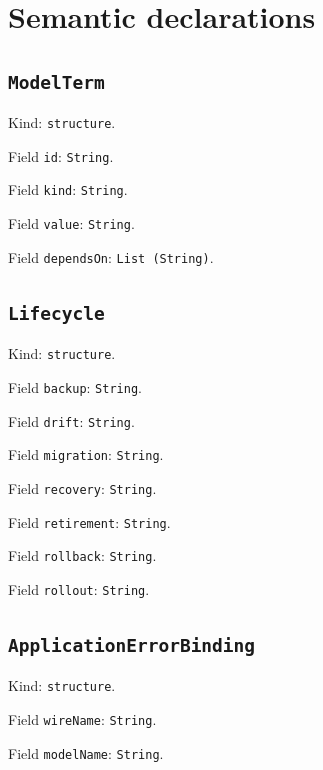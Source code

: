 \documentclass[11pt]{article}
\begin{document}
\section*{Semantic declarations}
\subsection*{\texttt{ModelTerm}}
\noindent Kind: \texttt{structure}.\par
\noindent Field \texttt{id}: \texttt{String}.\par
\noindent Field \texttt{kind}: \texttt{String}.\par
\noindent Field \texttt{value}: \texttt{String}.\par
\noindent Field \texttt{dependsOn}: \texttt{List (String)}.\par
\subsection*{\texttt{Lifecycle}}
\noindent Kind: \texttt{structure}.\par
\noindent Field \texttt{backup}: \texttt{String}.\par
\noindent Field \texttt{drift}: \texttt{String}.\par
\noindent Field \texttt{migration}: \texttt{String}.\par
\noindent Field \texttt{recovery}: \texttt{String}.\par
\noindent Field \texttt{retirement}: \texttt{String}.\par
\noindent Field \texttt{rollback}: \texttt{String}.\par
\noindent Field \texttt{rollout}: \texttt{String}.\par
\subsection*{\texttt{ApplicationErrorBinding}}
\noindent Kind: \texttt{structure}.\par
\noindent Field \texttt{wireName}: \texttt{String}.\par
\noindent Field \texttt{modelName}: \texttt{String}.\par
\end{document}
